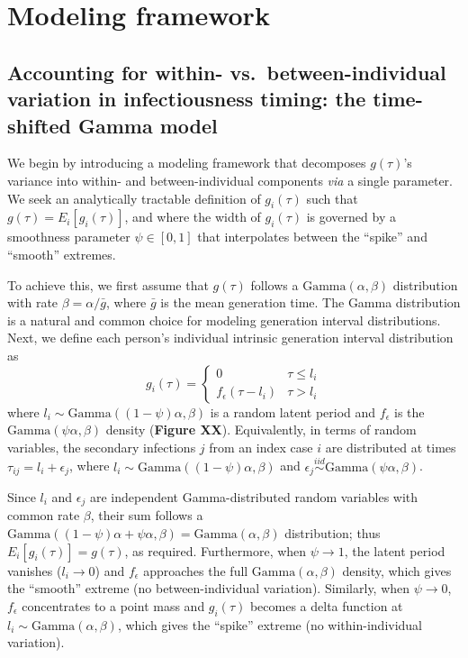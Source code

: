 \clearpage
\section{Modeling framework}

\subsection{Accounting for within- vs.~between-individual variation in infectiousness timing: the time-shifted Gamma model}
We begin by introducing a modeling framework that decomposes $g(\tau)$'s variance into within- and between-individual components {\it via} a single parameter. We seek an analytically tractable definition of $g_i(\tau)$ such that $g(\tau) = E_i[g_i(\tau)]$, and where the width of $g_i(\tau)$ is governed by a smoothness parameter $\psi \in [0,1]$ that interpolates between the ``spike'' and ``smooth'' extremes. 

To achieve this, we first assume that $g(\tau)$ follows a $\text{Gamma}(\alpha, \beta)$ distribution with rate $\beta = \alpha / \bar{g}$, where $\bar{g}$ is the mean generation time. The Gamma distribution is a natural and common choice for modeling generation interval distributions. Next, we define each person's individual intrinsic generation interval distribution as 
%
\begin{equation}
	g_i(\tau) = \begin{cases}
		0 & \tau \leq l_i \\ 
		f_\epsilon(\tau - l_i) & \tau > l_i
	\end{cases}
\end{equation}
%
where $l_i \sim \text{Gamma}((1-\psi)\alpha, \beta)$ is a random latent period and $f_\epsilon$ is the $\text{Gamma}(\psi \alpha, \beta)$ density ({\bf Figure XX}). Equivalently, in terms of random variables, the secondary infections $j$ from an index case $i$ are distributed at times $\tau_{ij} = l_i + \epsilon_j$, where $l_i \sim \text{Gamma}((1-\psi)\alpha, \beta)$ and $\epsilon_j \overset{iid}{\sim} \text{Gamma}(\psi \alpha, \beta)$. 

Since $l_i$ and $\epsilon_j$ are independent Gamma-distributed random variables with common rate $\beta$, their sum follows a $\text{Gamma}((1-\psi) \alpha + \psi \alpha, \beta) = \text{Gamma}(\alpha, \beta)$ distribution; thus $E_i[g_i(\tau)] = g(\tau)$, as required. Furthermore, when $\psi \rightarrow 1$, the latent period vanishes ($l_i \rightarrow 0$) and $f_\epsilon$ approaches the full $\text{Gamma}(\alpha, \beta)$ density, which gives the ``smooth'' extreme (no between-individual variation). Similarly, when $\psi \rightarrow 0$, $f_\epsilon$ concentrates to a point mass and $g_i(\tau)$ becomes a delta function at $l_i \sim \text{Gamma}(\alpha, \beta)$, which gives the ``spike'' extreme (no within-individual variation). 

